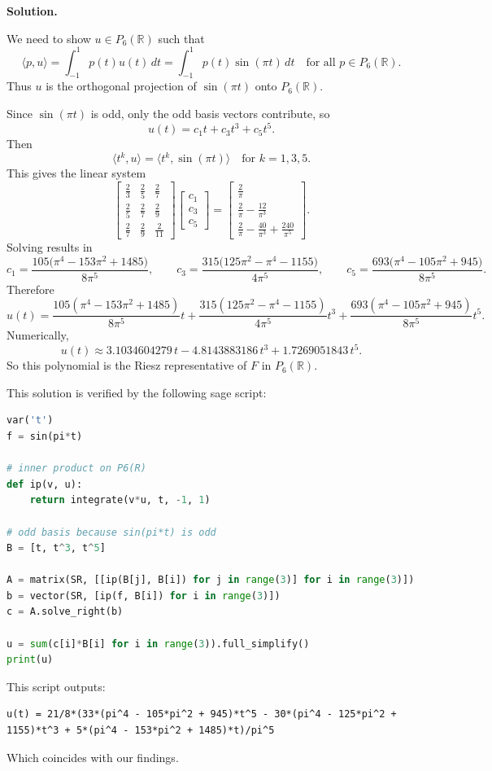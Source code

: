 \documentclass[11pt]{article}
\newcommand{\SolutionAnnounce}{\noindent\textbf{Solution.}\par\medskip}
\newcommand{\R}{\mathbb{R}}
\begin{document}
\begin{solutionBox}
\SolutionAnnounce
\doublespacing
We need to show $u\in P_6(\R)$ such that
\[
\langle p,u\rangle=\int_{-1}^{1} p(t)u(t)\,dt=\int_{-1}^{1} p(t)\sin(\pi t)\,dt
\quad\text{for all } p\in P_6(\R).
\]
Thus $u$ is the orthogonal projection of $\sin(\pi t)$ onto $P_6(\R)$.

Since $\sin(\pi t)$ is odd, only the odd basis vectors contribute, so 
\[
u(t)=c_1 t+c_3 t^3+c_5 t^5.
\]
Then 
\[
\langle t^k,u\rangle=\langle t^k,\sin(\pi t)\rangle
\quad\text{for } k=1,3,5.
\]
This gives the linear system
\[
\begin{bmatrix}
\frac23 & \frac25 & \frac27\\
\frac25 & \frac27 & \frac29\\
\frac27 & \frac29 & \frac{2}{11}
\end{bmatrix}
\begin{bmatrix}
c_1\\ c_3\\ c_5
\end{bmatrix}
=
\begin{bmatrix}
\frac{2}{\pi}\\[2mm]
\frac{2}{\pi}-\frac{12}{\pi^3}\\[2mm]
\frac{2}{\pi}-\frac{40}{\pi^3}+\frac{240}{\pi^5}
\end{bmatrix}.
\]
Solving results in
\[
c_1=\frac{105\bigl(\pi^4-153\pi^2+1485\bigr)}{8\pi^5},
\qquad
c_3=\frac{315\bigl(125\pi^2-\pi^4-1155\bigr)}{4\pi^5},
\qquad
c_5=\frac{693\bigl(\pi^4-105\pi^2+945\bigr)}{8\pi^5}.
\]
Therefore
\[
\boxed{
u(t)=\frac{105(\pi^4-153\pi^2+1485)}{8\pi^5}t
+\frac{315(125\pi^2-\pi^4-1155)}{4\pi^5}t^3
+\frac{693(\pi^4-105\pi^2+945)}{8\pi^5}t^5.}
\]
Numerically,
\[
\boxed{u(t)\approx 3.1034604279\,t-4.8143883186\,t^3+1.7269051843\,t^5.}
\]
So this polynomial is the Riesz representative of $F$ in $P_6(\R)$.

\medskip
This solution is verified by the following sage script:

\begin{codeBox}
  \begin{lstlisting}[language=Python]
var('t')
f = sin(pi*t)

# inner product on P6(R)
def ip(v, u):
    return integrate(v*u, t, -1, 1)

# odd basis because sin(pi*t) is odd
B = [t, t^3, t^5]

A = matrix(SR, [[ip(B[j], B[i]) for j in range(3)] for i in range(3)])
b = vector(SR, [ip(f, B[i]) for i in range(3)])
c = A.solve_right(b)

u = sum(c[i]*B[i] for i in range(3)).full_simplify()
print(u)
\end{lstlisting}
\end{codeBox}
This script outputs:
\begin{codeBox}
\begin{lstlisting}[breaklines=true, breakatwhitespace=true]
u(t) = 21/8*(33*(pi^4 - 105*pi^2 + 945)*t^5 - 30*(pi^4 - 125*pi^2 + 1155)*t^3 + 5*(pi^4 - 153*pi^2 + 1485)*t)/pi^5
\end{lstlisting}
\end{codeBox}
\end{solutionBox}
Which coincides with our findings.
\end{document}
